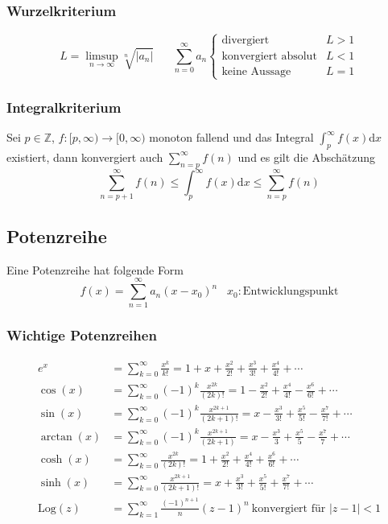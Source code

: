 \documentclass[8pt, a4paper, landscape, fleqn]{scrartcl}
\def\Log{\text{Log}}
\begin{document}
\begin{multicols*}{3}
				\subsubsection{Wurzelkriterium}
					\vspace{-10pt}
					\begin{equation*}
						L=\limsup_{n\rightarrow \infty} \sqrt[n]{\vert a_n \vert} \hspace{20pt} \sum_{n=0}^{\infty}a_n
						\begin{cases}
							\text{divergiert} \hspace{5pt} &L>1\\
							\text{konvergiert absolut} &L<1\\
							\text{keine Aussage} &L=1
						\end{cases}
					\end{equation*}
				\subsubsection{Integralkriterium}
					Sei $p \in \mathbb{Z}$, $f: [p, \infty) \rightarrow [0, \infty)$ monoton fallend und das Integral $\int_{p}^{\infty}f(x)$d$x$ existiert, dann konvergiert auch $\sum_{n=p}^{\infty}f(n)$ und es gilt die Abschätzung
					\begin{equation*}
						\sum_{n=p+1}^{\infty}f(n) \le \int_{p}^{\infty}f(x)\text{d}x \le \sum_{n=p}^{\infty}f(n)
					\end{equation*}		
			\subsection{Potenzreihe}
				Eine Potenzreihe hat folgende Form
				\[f(x)=\sum_{n=1}^{\infty}a_n(x-x_0)^n \hspace{10pt} x_0: \text{Entwicklungspunkt}\]	
				\subsubsection{Wichtige Potenzreihen}
					\vspace{-7pt}
					\begin{align*}
						e^x&= \sum_{k=0}^{\infty}\frac{x^k}{k!}=1+x+\frac{x^2}{2!}+\frac{x^3}{3!}+\frac{x^4}{4!}+\cdots\\
						\cos(x)&=\sum_{k=0}^{\infty}(-1)^k \frac{x^{2k}}{(2k)!}=1-\frac{x^2}{2!}+\frac{x^4}{4!}-\frac{x^6}{6!}+\cdots\\
						\sin(x)&=\sum_{k=0}^{\infty}(-1)^k \frac{x^{2k+1}}{(2k+1)!}=x-\frac{x^3}{3!}+\frac{x^5}{5!}-\frac{x^7}{7!}+\cdots\\
						\arctan(x)&=\sum_{k=0}^{\infty}(-1)^k \frac{x^{2k+1}}{(2k+1)}=x-\frac{x^3}{3}+\frac{x^5}{5}-\frac{x^7}{7}+\cdots\\
						\cosh(x)&=\sum_{k=0}^{\infty} \frac{x^{2k}}{(2k)!}=1+\frac{x^2}{2!}+\frac{x^4}{4!}+\frac{x^6}{6!}+\cdots\\
						\sinh(x)&=\sum_{k=0}^{\infty} \frac{x^{2k+1}}{(2k+1)!}=x+\frac{x^3}{3!}+\frac{x^5}{5!}+\frac{x^7}{7!}+\cdots \\
						\Log(z)&=\sum_{k=1}^\infty \frac{(-1)^{n+1}}{n}(z-1)^n \ \text{konvergiert für } |z-1| < 1
					\end{align*}

\end{multicols*}
\end{document}
